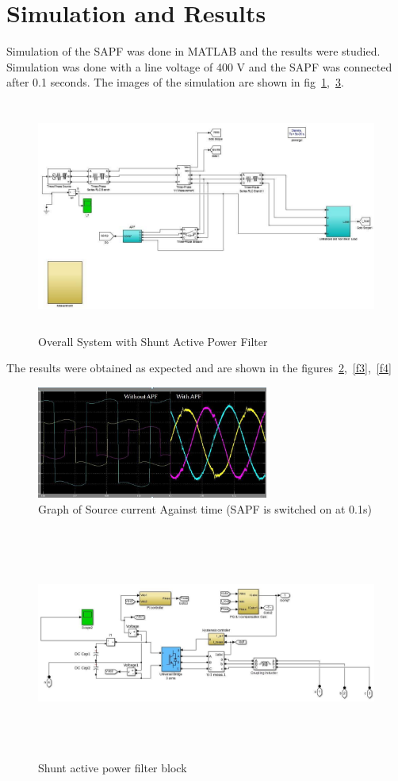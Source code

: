 \documentclass[journal,twoside]{IEEEtran}
\begin{document}
	\section{Simulation and Results}
Simulation of the SAPF was done in MATLAB and the
results were studied. Simulation was done with a line voltage
of 400 V and the SAPF was connected after 0.1 seconds. The
images of the simulation are shown in fig~\ref{a1},~\ref{a2}.
\begin{figure}[!ht]
\centering
\includegraphics[height=3in , angle =90]{a1}
\caption{Overall System with Shunt Active Power Filter}
\label{a1}
\end{figure}

The results were obtained as expected and are shown in the figures~\ref{f2},~\ref{f3},~\ref{f4}
\begin{figure}[!htbp]
\centering
\includegraphics[width=3in]{2}
\caption{Graph of Source current Against time (SAPF is switched on at 0.1s)}
\label{f2}
\end{figure}

\begin{figure}[H]
\centering
\includegraphics[height=3in, angle =90]{a2}
\caption{Shunt active power filter block}
\label{a2}
\end{figure}
\end{document}
